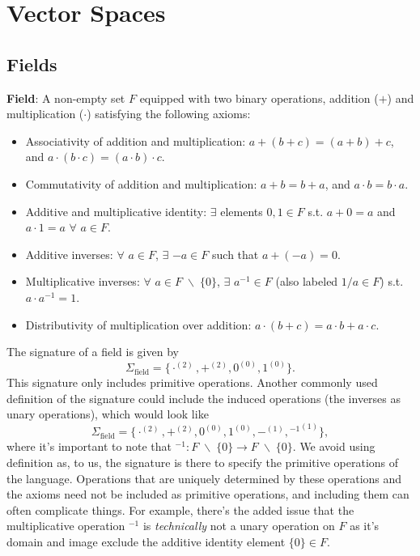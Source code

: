 \chapter{Vector Spaces}
\section{Fields}
\textbf{Field}: A non-empty set $F$ equipped with two binary operations, addition ($+$) and multiplication ($\cdot$) satisfying the following axioms:
\begin{itemize}
    \item Associativity of addition and multiplication: $a + (b+c) = (a+b) + c$, and $a\cdot (b\cdot c)=(a\cdot b)\cdot c$.
    \item Commutativity of addition and multiplication: $a + b = b + a$, and $a\cdot b=b\cdot a$.
    \item Additive and multiplicative identity: $\exists$ elements $0, 1\in F$ s.t. $a+0=a$ and $a\cdot 1=a$ $\forall$ $a\in F$.
    \item Additive inverses: $\forall$ $a\in F$, $\exists$ $-a\in F$ such that $a + (-a) = 0.$
    \item Multiplicative inverses: $\forall$ $a\in F \;\backslash\;\{0\}$, $\exists$ $a^{-1}\in F$ (also labeled $1/a\in F$) s.t. $a \cdot a^{-1}=1$.
    \item Distributivity of multiplication over addition: $a \cdot (b + c) = a\cdot b + a\cdot c$.
\end{itemize}
The signature of a field is given by 
\[
    \Sigma_{\text{field}} = \{\cdot^{(2)}, +^{(2)}, 0^{(0)}, 1^{(0)}\}. 
\]
This signature only includes primitive operations. Another commonly used definition of the signature could include the induced operations (the inverses as unary operations), which would look like 
\[
    \Sigma_{\text{field}} = \{\cdot^{(2)}, +^{(2)}, 0^{(0)}, 1^{(0)}, -^{(1)}, {^{-1}}^{(1)}\},
\]
where it's important to note that $^{-1}: F\;\backslash\;\{0\}\rightarrow F\;\backslash\;\{0\}$. We avoid using definition as, to us, the signature is there to specify the primitive operations of the language. Operations that are uniquely determined by these operations and the axioms need not be included as primitive operations, and including them can often complicate things. For example, there's the added issue that the multiplicative operation $^{-1}$ is \textit{technically} not a unary operation on $F$ as it's domain and image exclude the additive identity element $\{0\}\in F$.

